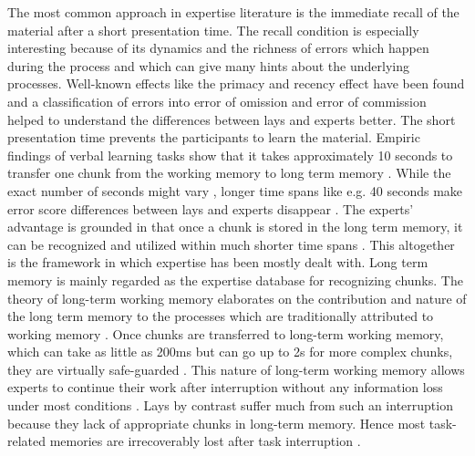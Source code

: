 The most common approach in expertise literature is the immediate recall of the material after a short presentation time.
The recall condition is especially interesting because of its dynamics and the richness of errors which happen during the process and which can give many hints about the underlying processes.
Well-known effects like the primacy and recency effect have been found \cite{gobet1996templates} and a classification of errors into error of omission and error of commission \cite{chase1973mind} helped to understand the differences between lays and experts better.
The short presentation time prevents the participants to learn the material.
Empiric findings of verbal learning tasks show that it takes approximately 10 seconds to transfer one chunk from the working memory to long term memory \cite{newell1972human}.
While the exact number of seconds might vary \parencites(cf. e.g.,)(){egan1979chunking}, longer time spans like e.g. 40 seconds make error score differences between lays and experts disappear \cite{moss2006role}.
The experts' advantage is grounded in that once a chunk is stored in the long term memory, it can be recognized and utilized within much shorter time spans \parencites(e.g.,)(){gobet1996templates}.
This altogether is the framework in which expertise has been mostly dealt with.
Long term memory is mainly regarded as the expertise database for recognizing chunks.
The theory of long-term working memory elaborates on the contribution and nature of the long term memory to the processes which are traditionally attributed to working memory \cite{ericsson1996expert,ericsson1999long}.
Once chunks are transferred to long-term working memory, which can take as little as 200ms \cite{ericsson1999long} but can go up to 2s \cite{ericsson1988experimental} for more complex chunks, they are virtually safe-guarded \cite{oulasvirta2006surviving,gobet1996templates}.
This nature of long-term working memory allows experts to continue their work after interruption without any information loss under most conditions \cite{oulasvirta2006surviving}.
Lays by contrast suffer much from such an interruption because they lack of appropriate chunks in long-term memory.
Hence most task-related memories are irrecoverably lost after task interruption
\cite{oulasvirta2006surviving}.
